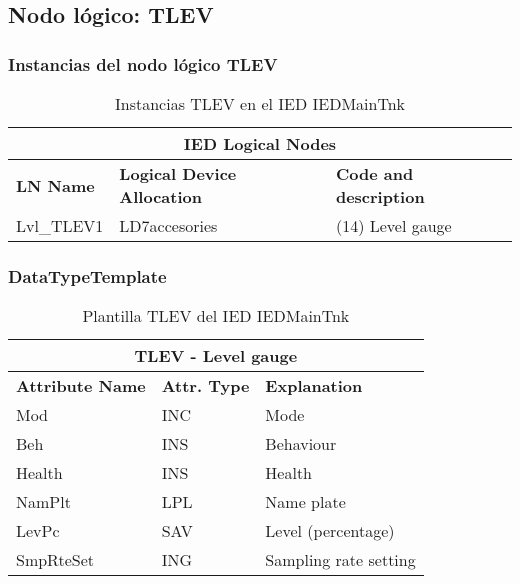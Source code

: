 
\subsection{Nodo l\'ogico: 			 TLEV}

    \subsubsection{Instancias del nodo l\'ogico TLEV}
    \begin{table}[H]
    \begin{center}
    \begin{tabular}{|l|l|p{6.8cm}|}
            \hline
            \multicolumn{3}{|c|}{\cellcolor[gray]{0.8} \textbf{IED Logical Nodes} } \\
            \hline
            \textbf{LN Name} & \textbf{Logical Device Allocation} & \textbf{Code and description} \\
            \hline
            Lvl\_TLEV1 & LD7accesories & (14) Level gauge  \\
            \hline
    \end{tabular}
    \caption{Instancias TLEV en el IED IEDMainTnk}
    \label{table:lnInstTLEV_gauge}
    \end{center}
    \end{table}
    
    
    
    \subsubsection{DataTypeTemplate}
    \begin{table}[H]
    \begin{center}
    \begin{tabular}{|l|l|p{8.5cm}|}
            \hline
            \multicolumn{3}{|c|}{\cellcolor[gray]{0.8} \textbf{ TLEV}  - Level gauge} \\
            \hline
            \textbf{Attribute Name} & \textbf{Attr. Type} & \textbf{Explanation} \\
            \hline 
            Mod & INC & Mode \\
            \hline
            Beh & INS & Behaviour \\
            \hline
            Health & INS & Health \\
            \hline
            NamPlt & LPL & Name plate \\
            \hline
            LevPc & SAV & Level (percentage) \\
            \hline
            SmpRteSet & ING & Sampling rate setting \\
            \hline
    \end{tabular}
    \caption{Plantilla TLEV del IED IEDMainTnk}
    \label{table:lnTypeTLEV_gauge}
    \end{center}
    \end{table}
    
    
    